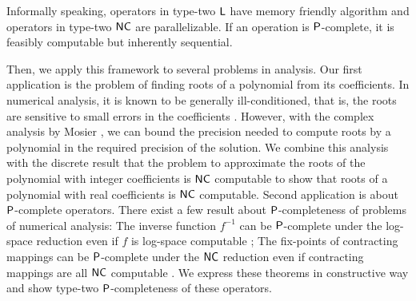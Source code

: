 \documentclass[envcountsame,orivec,oribibl]{llncs}
\begin{document}
Informally speaking, operators in type-two $\mathsf{L}$ have
memory friendly algorithm and operators in type-two $\mathsf{NC}$
are parallelizable.
If an operation is $\mathsf{P}$-complete,
it is feasibly computable but inherently sequential. 

Then, we apply this framework to several problems in analysis.
Our first application is the problem of finding roots of a polynomial 
from its coefficients.
In numerical analysis, it is known to be generally ill-conditioned, 
that is, the roots are sensitive to 
small errors in the coefficients \cite{wilkinson1963rounding}.
However, with the complex analysis by Mosier \cite{mosier1986root},
we can bound the precision needed to compute
roots by a polynomial in the required precision of the solution.
We combine this analysis with the discrete result 
that the problem to approximate the roots of the polynomial with integer 
coefficients is $\mathsf{NC}$ computable \cite{neff1994specified}
to show that roots of a polynomial with real coefficients
is $\mathsf{NC}$ computable.
Second application is about $\mathsf{P}$-complete operators.
There exist a few result about $\mathsf{P}$-completeness of problems of numerical analysis:
The inverse function $f^{-1}$ can be $\mathsf{P}$-complete under the log-space
reduction even if $f$ is log-space computable \cite{ko1983computational};
The fix-points of contracting mappings can be $\mathsf{P}$-complete under the
$\mathsf{NC}$ reduction even if contracting mappings are all $\mathsf{NC}$ computable \cite{hoover1991real}.
We express these theorems in constructive way and
show type-two $\mathsf{P}$-completeness of these operators.




\end{document}
